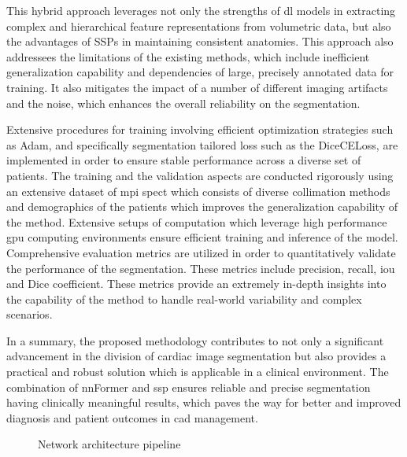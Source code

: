 This hybrid approach leverages not only the strengths of \gls{dl} models in extracting complex and hierarchical feature representations from volumetric data, but also the advantages of SSPs in maintaining consistent anatomies. This approach also addressees the limitations of the existing methods, which include inefficient generalization capability and dependencies of large, precisely annotated data for training. It also mitigates the impact of a number of different imaging artifacts and the noise, which enhances the overall reliability on the segmentation.

Extensive procedures for training involving efficient optimization strategies such as Adam, and specifically segmentation tailored loss such as the DiceCELoss, are implemented in order to ensure stable performance across a diverse set of patients. The training and the validation aspects are conducted rigorously using an extensive dataset of \gls{mpi} \gls{spect} which consists of diverse collimation methods and demographics of the patients which improves the generalization capability of the method. Extensive setups of computation which leverage high performance \gls{gpu} computing environments ensure efficient training and inference of the model. Comprehensive evaluation metrics are utilized in order to quantitatively validate the performance of the segmentation. These metrics include precision, recall, \gls{iou} and Dice coefficient. These metrics provide an extremely in-depth insights into the capability of the method to handle real-world variability and complex scenarios.

In a summary, the proposed methodology contributes to not only a significant advancement in the division of cardiac image segmentation but also provides a practical and robust solution which is applicable in a clinical environment. The combination of nnFormer and \gls{ssp} ensures reliable and precise segmentation having clinically meaningful results, which paves the way for better and improved diagnosis and patient outcomes in \gls{cad} management.

\begin{figure}[htb!] %
\centering
\centering
\resizebox{1\textwidth}{!}{

}
\caption{\centering Network architecture pipeline}
\label{Fig:network_pipeline}
\end{figure}

